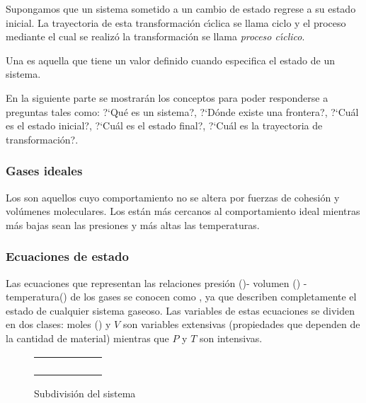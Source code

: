 Supongamos que un sistema sometido a un cambio de estado regrese a su estado inicial. La trayectoria de esta transformaci\'on c\'{\i}clica se llama ciclo y el proceso mediante el cual se realiz\'o la transformaci\'on se llama \textit{proceso c\'{\i}clico}.

Una \textit{}  es aquella que tiene un
valor definido cuando especifica el estado de un sistema.

En la siguiente parte se mostrar\'an los conceptos para poder responderse a preguntas tales como: ?`Qu\'e es un sistema?, ?`D\'onde existe una frontera?, ?`Cu\'al es el estado inicial?, ?`Cu\'al es el estado final?, ?`Cu\'al es la trayectoria de transformaci\'on?.


\subsubsection{Gases ideales} 
Los  son aquellos cuyo comportamiento no se
altera por fuerzas de cohesi\'on y vol\'umenes moleculares. Los 
est\'an m\'as cercanos al comportamiento ideal mientras m\'as bajas sean las
presiones y m\'as altas las temperaturas.

\subsubsection{Ecuaciones de estado}

Las ecuaciones  que representan las relaciones presi\'on
()- volumen () -
temperatura() de los gases se conocen como , ya que describen completamente el estado de cualquier
sistema gaseoso. Las variables de estas ecuaciones se dividen en dos clases:
moles () y $V$ son variables extensivas (propiedades que dependen de la
cantidad de material) mientras que $P$ y $T$ son intensivas.

\begin{figure}[h]

\begin{center}
\begin{tabular}{||c|c|c|c|c|c||} \hline \hline
      &           &          &           &  & \\ \hline
      &           &          &           &  & \\ \hline
      &           &          &           &  & \\ \hline
      &           &          &           &  & \\ \hline
      &           &          &           &  &  \\ \hline \hline
\end{tabular}
\caption{Subdivisi\'on del sistema}
\label{fig:1}
\end{center}
\end{figure}


